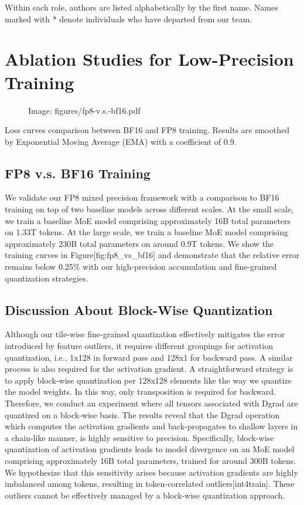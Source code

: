 \documentclass[11pt,a4paper]{article}
\begin{document}
Within each role, authors are listed alphabetically by the first name. 
Names marked with * denote individuals who have departed from our team.

\section{Ablation Studies for Low-Precision Training}

\begin{figure}[h]
\caption{Image: figures/fp8-v.s.-bf16.pdf}
\end{figure}

Loss curves comparison between BF16 and FP8 training. 
 Results are smoothed by Exponential Moving Average (EMA) with a coefficient of 0.9.

\subsection{FP8 v.s. BF16 Training}

We validate our FP8 mixed precision framework with a comparison to BF16 training on top of two baseline models across different scales. At the small scale, we train a baseline MoE model comprising approximately 16B total parameters on 1.33T tokens. 
At the large scale, we train a baseline MoE model comprising approximately 230B total parameters on around 0.9T tokens. We show the training curves in Figure[fig:fp8\_vs\_bf16] and demonstrate that the relative error remains below 0.25\% with our high-precision accumulation and fine-grained quantization strategies.

\subsection{Discussion About Block-Wise Quantization}

Although our tile-wise fine-grained quantization effectively mitigates the error introduced by feature outliers, it requires different groupings for activation quantization, i.e., 1x128 in forward pass and 128x1 for backward pass. 
A similar process is also required for the activation gradient. 
A straightforward strategy is to apply block-wise quantization per 128x128 elements like the way we quantize the model weights.
In this way, only transposition is required for backward.
Therefore, we conduct an experiment where all tensors associated with Dgrad are quantized on a block-wise basis. 
The results reveal that the Dgrad operation which computes the activation gradients and back-propagates to shallow layers in a chain-like manner, is highly sensitive to precision. 
Specifically, block-wise quantization of activation gradients leads to model divergence on an MoE model comprising approximately 16B total parameters, trained for around 300B tokens. 
We hypothesize that this sensitivity arises because activation gradients are highly imbalanced among tokens, resulting in token-correlated outliers[int4train]. 
These outliers cannot be effectively managed by a block-wise quantization approach.
\end{document}
